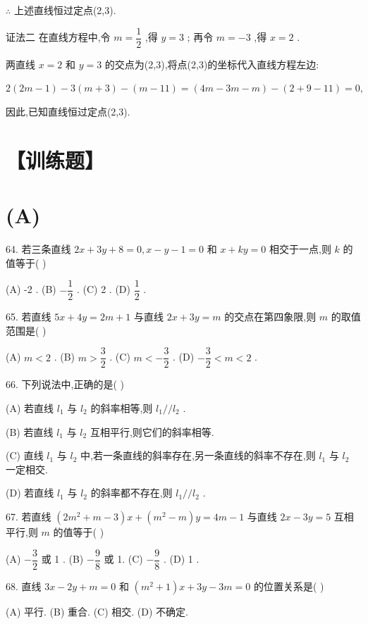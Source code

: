$\therefore$ 上述直线恒过定点(2,3).

证法二 在直线方程中,令 $m = \dfrac{1}{2}$ ,得 $y = 3$ ; 再令 $m =  - 3$ ,得 $x = 2$ .

两直线 $x = 2$ 和 $y = 3$ 的交点为(2,3),将点(2,3)的坐标代入直线方程左边:

$2\left( {{2m} - 1}\right)  - 3\left( {m + 3}\right)  - \left( {m - {11}}\right)  = \left( {{4m} - {3m} - m}\right)  - \left( {2 + 9 - {11}}\right)  = 0,$

因此,已知直线恒过定点(2,3).

\section*{【训练题】}

\section*{(A)}

64. 若三条直线 ${2x} + {3y} + 8 = 0,x - y - 1 = 0$ 和 $x + {ky} = 0$ 相交于一点,则 $k$ 的值等于(   )

(A) -2 . (B) $- \dfrac{1}{2}$ . (C) 2 . (D) $\dfrac{1}{2}$ .

65. 若直线 ${5x} + {4y} = {2m} + 1$ 与直线 ${2x} + {3y} = m$ 的交点在第四象限,则 $m$ 的取值范围是(   )

(A) $m < 2$ . (B) $m > \dfrac{3}{2}$ . (C) $m <  - \dfrac{3}{2}$ . (D) $- \dfrac{3}{2} < m < 2$ .

66. 下列说法中,正确的是(   )

(A) 若直线 ${l}_{1}$ 与 ${l}_{2}$ 的斜率相等,则 ${l}_{1}//{l}_{2}$ .

(B) 若直线 ${l}_{1}$ 与 ${l}_{2}$ 互相平行,则它们的斜率相等.

(C) 直线 ${l}_{1}$ 与 ${l}_{2}$ 中,若一条直线的斜率存在,另一条直线的斜率不存在,则 ${l}_{1}$ 与 ${l}_{2}$ 一定相交.

(D) 若直线 ${l}_{1}$ 与 ${l}_{2}$ 的斜率都不存在,则 ${l}_{1}//{l}_{2}$ .

67. 若直线 $\left( {2{m}^{2} + m - 3}\right) x + \left( {{m}^{2} - m}\right) y = {4m} - 1$ 与直线 ${2x} - {3y} = 5$ 互相平行,则 $m$ 的值等于(   )

(A) $- \dfrac{3}{2}$ 或 1 . (B) $- \dfrac{9}{8}$ 或 1. (C) $- \dfrac{9}{8}$ . (D) 1 .

68. 直线 ${3x} - {2y} + m = 0$ 和 $\left( {{m}^{2} + 1}\right) x + {3y} - {3m} = 0$ 的位置关系是(   )

(A) 平行. (B) 重合. (C) 相交. (D) 不确定.

